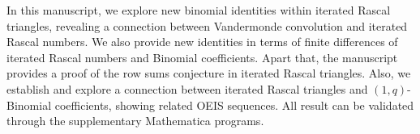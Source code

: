 In this manuscript, we explore new binomial identities within iterated Rascal triangles,
revealing a connection between Vandermonde convolution and iterated Rascal numbers.
We also provide new identities in terms of finite differences of iterated Rascal numbers and Binomial coefficients.
Apart that, the manuscript provides a proof of the row sums conjecture in iterated Rascal triangles.
Also, we establish and explore a connection between iterated Rascal triangles and $(1,q)$-Binomial coefficients,
showing related OEIS sequences.
All result can be validated through the supplementary Mathematica programs.
